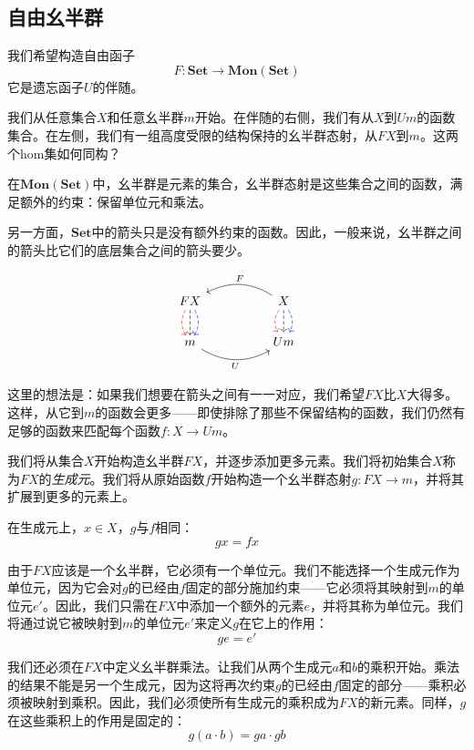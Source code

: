 \documentclass[DaoFP]{subfiles}
\begin{document}
\subsection{自由幺半群}

我们希望构造自由函子
\[ F \colon \mathbf{Set} \to \mathbf{Mon}(\mathbf{Set})\]
它是遗忘函子$U$的伴随。

我们从任意集合$X$和任意幺半群$m$开始。在伴随的右侧，我们有从$X$到$U m$的函数集合。在左侧，我们有一组高度受限的结构保持的幺半群态射，从$F X$到$m$。这两个hom集如何同构？

在$\mathbf{Mon}(\mathbf{Set})$中，幺半群是元素的集合，幺半群态射是这些集合之间的函数，满足额外的约束：保留单位元和乘法。

另一方面，$\mathbf{Set}$中的箭头只是没有额外约束的函数。因此，一般来说，幺半群之间的箭头比它们的底层集合之间的箭头要少。

\[
 \begin{tikzcd}
F X
\arrow[d, bend right, red, dashed]
\arrow[d, dashed]
\arrow[d, bend left, blue, dashed]
  &&
X
\arrow[d, bend right, red, dashed]
\arrow[d, dashed]
\arrow[d, bend left, blue, dashed]
 \arrow[ll, bend right, "F"']
 \\
m
   \arrow[rr, bend right, "U"']
 &&
 U m
  \end{tikzcd}
\]

这里的想法是：如果我们想要在箭头之间有一一对应，我们希望$F X$比$X$大得多。这样，从它到$m$的函数会更多——即使排除了那些不保留结构的函数，我们仍然有足够的函数来匹配每个函数$f \colon X \to U m$。

我们将从集合$X$开始构造幺半群$F X$，并逐步添加更多元素。我们将初始集合$X$称为$F X$的\emph{生成元}。我们将从原始函数$f$开始构造一个幺半群态射$g \colon F X \to m$，并将其扩展到更多的元素上。

在生成元上，$x \in X$，$g$与$f$相同：
\[ g x = f x \]

由于$F X$应该是一个幺半群，它必须有一个单位元。我们不能选择一个生成元作为单位元，因为它会对$g$的已经由$f$固定的部分施加约束——它必须将其映射到$m$的单位元$e'$。因此，我们只需在$F X$中添加一个额外的元素$e$，并将其称为单位元。我们将通过说它被映射到$m$的单位元$e'$来定义$g$在它上的作用：
\[ g e = e' \]

我们还必须在$F X$中定义幺半群乘法。让我们从两个生成元$a$和$b$的乘积开始。乘法的结果不能是另一个生成元，因为这将再次约束$g$的已经由$f$固定的部分——乘积必须被映射到乘积。因此，我们必须使所有生成元的乘积成为$F X$的新元素。同样，$g$在这些乘积上的作用是固定的：
\[ g (a \cdot b)  = g a \cdot g b\]
\end{document}
